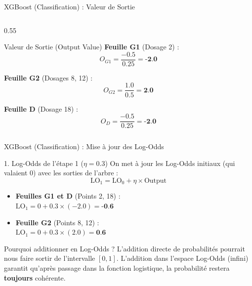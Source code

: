 \begin{frame}{XGBoost (Classification) : Valeur de Sortie}
\begin{columns}[T]
\begin{column}{0.55\textwidth}
\begin{block}{Valeur de Sortie (Output Value)}
                \vspace{0.1cm}
                \textbf{Feuille G1} (Dosage 2) :
                $$ O_{G1} = \frac{-0.5}{0.25} = \textbf{-2.0} $$
                
                \textbf{Feuille G2} (Dosages 8, 12) :
                $$ O_{G2} = \frac{1.0}{0.5} = \textbf{2.0} $$
                
                \textbf{Feuille D} (Dosage 18) :
                $$ O_{D} = \frac{-0.5}{0.25} = \textbf{-2.0} $$
            \end{block}
        \end{column}
    \end{columns}
\end{frame}

\begin{frame}{XGBoost (Classification) : Mise à jour des Log-Odds}
    \begin{block}{1. Log-Odds de l'étape 1 ($\eta = 0.3$)}
        \small
        On met à jour les Log-Odds initiaux (qui valaient $0$) avec les sorties de l'arbre :
        $$ \text{LO}_1 = \text{LO}_0 + \eta \times \text{Output} $$
        
        \vspace{0.2cm}
        \begin{itemize}
            \item \textbf{Feuilles G1 et D} (Points 2, 18) : \\ 
            $\text{LO}_1 = 0 + 0.3 \times (-2.0) = \textbf{-0.6}$
            
            \vspace{0.2cm}
            \item \textbf{Feuille G2} (Points 8, 12) : \\ 
            $\text{LO}_1 = 0 + 0.3 \times (2.0) = \textbf{0.6}$
        \end{itemize}
    \end{block}
    
    \begin{block}{Pourquoi additionner en Log-Odds ?}
        \small
        L'addition directe de probabilités pourrait nous faire sortir de l'intervalle $[0, 1]$. 
        L'addition dans l'espace Log-Odds (infini) garantit qu'après passage dans la fonction logistique, la probabilité restera \textbf{toujours} cohérente.
    \end{block}
\end{frame}

